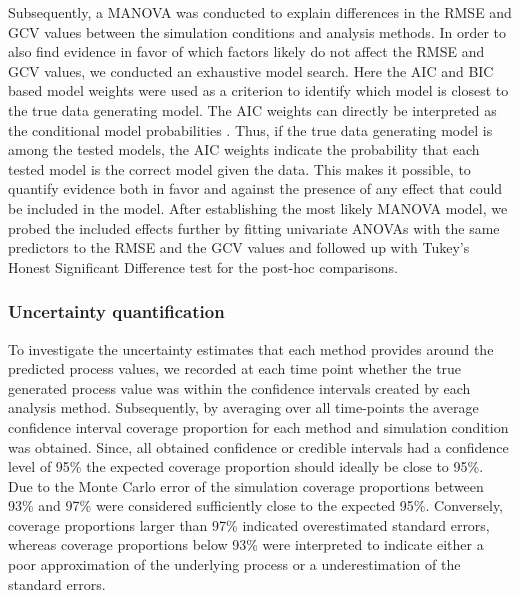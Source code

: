 Subsequently, a MANOVA was conducted to explain differences in the RMSE and
GCV values between the simulation conditions and analysis methods. In order to
also find evidence in favor of which factors likely do not affect the RMSE and
GCV values, we conducted an exhaustive model search. Here the AIC and BIC
based model weights were used as a criterion to identify which model is closest
to the true data generating model. The AIC weights can directly
be interpreted as the conditional model probabilities
\parencite{wagenmakers_aic_2004}. Thus, if the true
data generating model is among the tested models, the AIC weights indicate the
probability that each tested model is the correct model given the data. This
makes it possible, to quantify evidence both in favor and against the presence
of any effect that could be included in the model. After establishing the most
likely MANOVA model, we probed the included effects further by fitting
univariate ANOVAs with the same predictors to the RMSE and the GCV values and
followed up with Tukey's Honest Significant Difference test for the
post-hoc comparisons.

\subsubsection{Uncertainty quantification}

To investigate the uncertainty estimates that each method provides around the
predicted process values, we recorded at each time point whether the true
generated process value was within the confidence intervals created by each
analysis method. Subsequently, by averaging over all time-points the average
confidence interval coverage proportion for each method and simulation
condition was obtained. Since, all obtained confidence or credible intervals
had a confidence level of 95\% the expected coverage proportion should ideally
be close to 95\%. Due to the Monte Carlo error of the simulation coverage
proportions between 93\% and 97\% were considered sufficiently close to the
expected 95\%. Conversely, coverage proportions larger than 97\% indicated
overestimated standard errors, whereas coverage proportions below 93\% were
interpreted to indicate either a poor approximation of the underlying process
or a underestimation of the standard errors.
